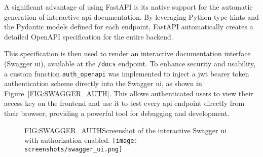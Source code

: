 A significant advantage of using FastAPI is its native support for the automatic generation of interactive \acs{api} documentation. By leveraging Python type hints and the Pydantic models defined for each endpoint, FastAPI automatically creates a detailed OpenAPI specification for the entire backend.

This specification is then used to render an interactive documentation interface (Swagger \acs{ui}), available at the \texttt{/docs} endpoint. To enhance security and usability, a custom function \texttt{auth\_openapi} was implemented to inject a \acs{jwt} bearer token authentication scheme directly into the Swagger \acs{ui}, as shown in Figure~\ref{FIG:SWAGGER_AUTH}. This allows authenticated users to view their access key on the frontend and use it to test every \acs{api} endpoint directly from their browser, providing a powerful tool for debugging and development.

\begin{figure}[Swagger UI]{FIG:SWAGGER_AUTH}{Screenshot of the interactive Swagger \acs{ui} with authorization enabled.}
    \texttt{[image: screenshots/swagger\_ui.png]}
\end{figure}